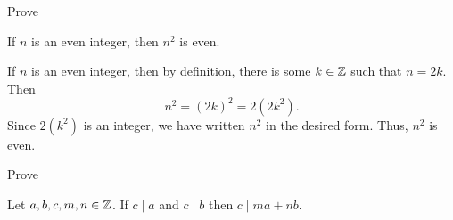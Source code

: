 \documentclass[handout,nooutcomes]{ximera}
\date{\classday, 2024}
\begin{document}
\handoutAbstract
\maketitle


\begin{br}
    Prove
        \begin{theorem}
            If $n$ is an even integer, then $n^2$ is even.
        \end{theorem}

        \begin{solution}
            If $n$ is an even integer, then by definition, there is some $k\in\mathbb Z$ such that $n=2k$. Then \[n^2=(2k)^2=2(2k^2).\] Since $2(k^2)$ is an integer, we have written $n^2$ in the desired form. Thus, $n^2$ is even.
        \end{solution}
\end{br}
\else
\fi


\begin{br}
    Prove
        \begin{theorem}
            Let $a,b,c,m,n\in\mathbb Z$.
            If $c\mid a$ and $c\mid b$ then $c\mid ma+nb$.
        \end{theorem}
\end{br}
\end{document}
